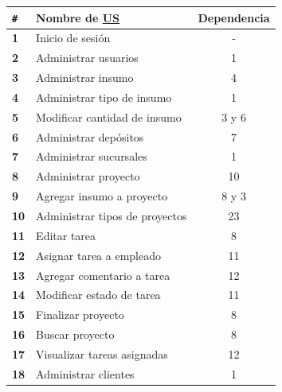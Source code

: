 \documentclass[a4paper, 12pt,twoside]{report}  %
\numberwithin{equation}{subsection} %
\begin{document}
\begin{table}[h!]
	\centering
	\begin{tabular}{ |p{0.5cm}|p{9cm}|c|  }
		\hline
		\verb|#|& \textbf{Nombre de \hyperlink{US}{US}}& \textbf{Dependencia} \\
		\hline
		\textbf{1} & \cellcolor{marca_US_realizada_anterior}Inicio de sesión & - \\
		\hline
		\textbf{2} & \cellcolor{marca_US_realizada_anterior}Administrar usuarios & 1 \\
		\hline
		\textbf{3} & \cellcolor{marca_US_realizada_anterior}Administrar insumo & 4 \\
		\hline
		\textbf{4} & \cellcolor{marca_US_realizada_anterior}Administrar tipo de insumo & 1 \\
		\hline
		\textbf{5} & \cellcolor{marca_US_realizada_anterior}Modificar cantidad de insumo & 3 y 6 \\
		\hline
		\textbf{6} & \cellcolor{marca_US_realizada_anterior}Administrar depósitos & 7 \\
		\hline
		\textbf{7} & \cellcolor{marca_US_realizada_anterior}Administrar sucursales & 1 \\
		\hline
		\textbf{8} & \cellcolor{marca_US_realizada_anterior}Administrar proyecto & 10 \\
		\hline
		\textbf{9} & \cellcolor{marca_US_realizada}Agregar insumo a proyecto & 8 y 3 \\
		\hline
		\textbf{10} & \cellcolor{marca_US_realizada_anterior}Administrar tipos de proyectos & 23 \\
		\hline
		\textbf{11} & \cellcolor{marca_US_realizada}Editar tarea & 8 \\
		\hline
		\textbf{12} & \cellcolor{marca_US_realizada_anterior}Asignar tarea a empleado & 11\\
		\hline
		\textbf{13} & \cellcolor{marca_US_realizada}Agregar comentario a tarea & 12 \\
		\hline
		\textbf{14} & \cellcolor{marca_US_realizada}Modificar estado de tarea & 11 \\
		\hline
		\textbf{15} & \cellcolor{marca_US_realizada}Finalizar proyecto & 8 \\
		\hline
		\textbf{16} & \cellcolor{marca_US_realizada_anterior}Buscar proyecto & 8 \\
		\hline
		\textbf{17} & \cellcolor{marca_US_realizada_anterior}Visualizar tareas asignadas & 12 \\
		\hline
		\textbf{18} & \cellcolor{marca_US_realizada_anterior}Administrar clientes & 1 \\

\end{tabular}
\end{table}
\end{document}
